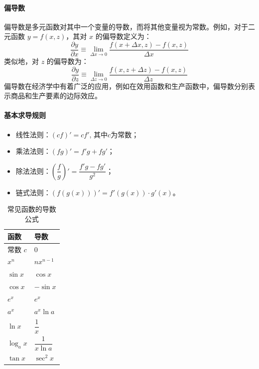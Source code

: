 \paragraph*{偏导数}
偏导数是多元函数对其中一个变量的导数，而将其他变量视为常数。例如，对于二元函数 \( y = f(x, z) \)，其对 \( x \) 的偏导数定义为：
\begin{equation}
	\frac{\partial y}{\partial x} \equiv \lim_{\Delta x \to 0} \frac{f(x + \Delta x, z) - f(x, z)}{\Delta x}
\end{equation}
\noindent 类似地，对 \( z \) 的偏导数为：
\begin{equation}
	\frac{\partial y}{\partial z} \equiv \lim_{\Delta z \to 0} \frac{f(x, z + \Delta z) - f(x, z)}{\Delta z}
\end{equation}
\noindent 偏导数在经济学中有着广泛的应用，例如在效用函数和生产函数中，偏导数分别表示商品和生产要素的边际效应。

\paragraph*{基本求导规则}

\begin{itemize}
	\item 线性法则：$(cf)' = c f'$, 其中$c$为常数；
	\item 乘法法则：$(fg)' = f'g + fg'$；
	\item 除法法则：$\left(\dfrac{f}{g}\right)' = \dfrac{f'g - fg'}{g^2}$；
	\item 链式法则：$(f(g(x)))' = f'(g(x)) \cdot g'(x)$。
\end{itemize}

\begin{table}[h]
	\centering
	\caption{常见函数的导数公式}
	\renewcommand{\arraystretch}{2}
	\begin{tabularx}{\linewidth}{>{\centering\arraybackslash}X >{\centering\arraybackslash}X}
		\toprule
		函数 & 导数 \\
		\midrule
		常数 $c$         & $0$ \\
		$x^n$            & $n x^{n-1}$ \\
		$\sin x$         & $\cos x$ \\
		$\cos x$         & $-\sin x$ \\
		$e^x$            & $e^x$ \\
		$a^x$            & $a^x \ln a$ \\
		$\ln x$          & $\dfrac{1}{x}$ \\
		$\log_a x$       & $\dfrac{1}{x \ln a}$ \\
		$\tan x$         & $\sec^2 x$ \\
		\bottomrule
	\end{tabularx}
\end{table}

